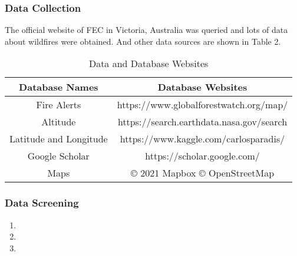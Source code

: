 \documentclass[12pt]{article}  %
\begin{document}
\subsubsection{Data Collection} %
The official website of FEC in Victoria, Australia was queried and lots of data about wildfires were obtained. And other data sources are shown in Table 2.

\begin{table}[htbp]
\begin{center}
\caption{Data and Database Websites}
\resizebox{\textwidth}{!}
{\begin{tabular}{c c}
\toprule[2pt]
\multicolumn{1}{m{5cm}}{\centering \textbf{Database Names}}
&\multicolumn{1}{m{10cm}}{\centering \textbf{Database Websites} }\\ %
\midrule
Fire Alerts& https://www.globalforestwatch.org/map/ \\
Altitude & https://search.earthdata.nasa.gov/search \\
Latitude and Longitude & https://www.kaggle.com/carlosparadis/\\ 
Google Scholar & https://scholar.google.com/ \\
Maps& \copyright{} 2021 Mapbox \copyright{} OpenStreetMap\\
\bottomrule[2pt]
\end{tabular}}
\end{center}
\end{table}

\subsubsection{Data Screening} %


\begin{enumerate}[\bfseries 1.]
	\setlength{\parsep}{0ex} %
	\setlength{\topsep}{0ex} %
	\setlength{\itemsep}{0ex} %
	\item 
	\item 
	\item 
\end{enumerate}

\end{document}
